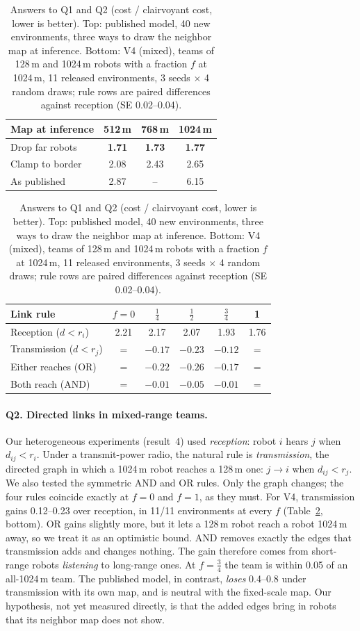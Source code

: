 \documentclass{article}
\begin{document}
\begin{table}[t]
\centering
\small
\caption{Answers to Q1 and Q2 (cost / clairvoyant cost, lower is better). Top: published model, 40 new environments, three ways to draw the neighbor map at inference. Bottom: V4 (mixed), teams of 128\,m and 1024\,m robots with a fraction $f$ at 1024\,m, 11 released environments, 3 seeds $\times$ 4 random draws; rule rows are paired differences against reception (SE 0.02--0.04).}
\label{tab:ta}
\begin{tabular}{lccc}
\toprule
Map at inference & 512\,m & 768\,m & 1024\,m \\
\midrule
Drop far robots & \textbf{1.71} & \textbf{1.73} & \textbf{1.77} \\
Clamp to border & 2.08 & 2.43 & 2.65 \\
As published & 2.87 & -- & 6.15 \\
\bottomrule
\end{tabular}
\par\medskip
\begin{tabular}{lccccc}
\toprule
Link rule & $f=0$ & $\tfrac14$ & $\tfrac12$ & $\tfrac34$ & 1 \\
\midrule
Reception ($d<r_i$) & 2.21 & 2.17 & 2.07 & 1.93 & 1.76 \\
Transmission ($d<r_j$) & = & $\mathbf{-0.17}$ & $\mathbf{-0.23}$ & $\mathbf{-0.12}$ & = \\
Either reaches (OR) & = & $-0.22$ & $-0.26$ & $-0.17$ & = \\
Both reach (AND) & = & $-0.01$ & $-0.05$ & $-0.01$ & = \\
\bottomrule
\end{tabular}
\end{table}

\paragraph{Q2. Directed links in mixed-range teams.} Our heterogeneous experiments (result~4) used \emph{reception}: robot $i$ hears $j$ when $d_{ij}<r_i$. Under a transmit-power radio, the natural rule is \emph{transmission}, the directed graph in which a 1024\,m robot reaches a 128\,m one: $j\to i$ when $d_{ij}<r_j$. We also tested the symmetric AND and OR rules. Only the graph changes; the four rules coincide exactly at $f=0$ and $f=1$, as they must. For V4, transmission gains 0.12--0.23 over reception, in 11/11 environments at every $f$ (Table~\ref{tab:ta}, bottom). OR gains slightly more, but it lets a 128\,m robot reach a robot 1024\,m away, so we treat it as an optimistic bound. AND removes exactly the edges that transmission adds and changes nothing. The gain therefore comes from short-range robots \emph{listening} to long-range ones. At $f=\tfrac34$ the team is within 0.05 of an all-1024\,m team. The published model, in contrast, \emph{loses} 0.4--0.8 under transmission with its own map, and is neutral with the fixed-scale map. Our hypothesis, not yet measured directly, is that the added edges bring in robots that its neighbor map does not show.
\end{document}
